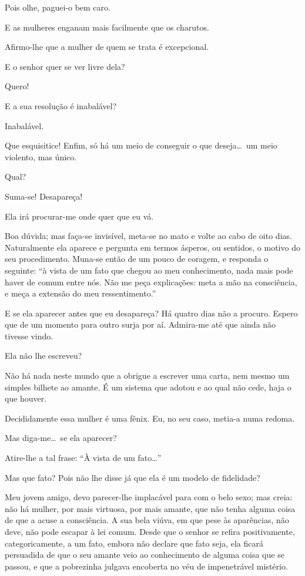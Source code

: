    Pois olhe, paguei{}-o
bem caro.

  E as mulheres enganam mais facilmente que os
charutos.

  Afirmo{}-lhe que a mulher de quem se trata é
excepcional.

  E o senhor quer se ver livre dela?

  Quero!

  E a sua resolução é inabalável? 

  Inabalável.

  Que esquisitice! Enfim, só há um meio de conseguir o que
deseja\ldots\ um meio violento, mas único.

  Qual?

  Suma{}-se! Desapareça!

  Ela irá procurar{}-me onde quer que eu vá.

  Boa dúvida; mas faça{}-se invisível, meta{}-se no mato e volte
ao cabo de oito dias. Naturalmente ela aparece e pergunta em termos
ásperos, ou sentidos, o motivo do seu procedimento. Muna{}-se então de um
pouco de coragem, e responda o seguinte: ``à vista de um
fato que chegou ao meu conhecimento, nada mais pode haver de comum
entre nós. Não me peça explicações: meta a mão na consciência, e meça a
extensão do meu ressentimento.''

  E se ela aparecer antes que eu desapareça? Há
quatro dias não a procuro. Espero que de um momento para outro surja
por aí. Admira{}-me até que ainda não tivesse vindo.

  Ela não lhe escreveu?

  Não há nada neste mundo que a obrigue a
escrever uma carta, nem mesmo um simples bilhete ao amante. É um
sistema que adotou e ao qual não cede, haja o que houver.

 Decididamente essa mulher é uma fênix. Eu,
no seu caso, metia{}-a numa redoma.

  Mas diga{}-me\ldots\ se ela aparecer?

  Atire{}-lhe a tal frase: ``À
vista de um fato\ldots''

   Mas que fato?
Pois não lhe disse já que ela é um modelo de fidelidade?

  Meu jovem
amigo, devo parecer{}-lhe implacável para com o belo sexo; mas creia: não
há mulher, por mais virtuosa, por mais amante, que não tenha alguma
coisa de que a acuse a consciência. A sua bela viúva, em que pese às
aparências, não deve, não pode escapar à lei comum. Desde que o senhor
se refira positivamente, categoricamente, a um fato, embora não declare
que fato seja, ela ficará persuadida de que o seu amante veio ao
conhecimento de alguma coisa que se passou, e que a pobrezinha julgava
encoberta no véu de impenetrável mistério.

